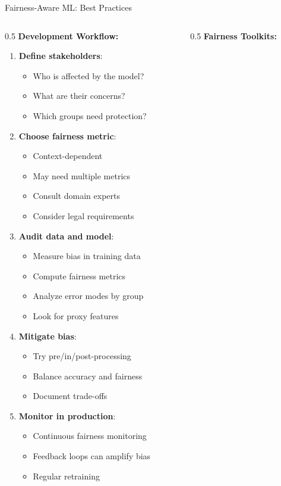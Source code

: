 \begin{frame}{Fairness-Aware ML: Best Practices}
\begin{columns}
\begin{column}{0.5\textwidth}
\textbf{Development Workflow:}

\begin{enumerate}
\item \textbf{Define stakeholders}:
   \begin{itemize}
   \item Who is affected by the model?
   \item What are their concerns?
   \item Which groups need protection?
   \end{itemize}

\item \textbf{Choose fairness metric}:
   \begin{itemize}
   \item Context-dependent
   \item May need multiple metrics
   \item Consult domain experts
   \item Consider legal requirements
   \end{itemize}

\item \textbf{Audit data and model}:
   \begin{itemize}
   \item Measure bias in training data
   \item Compute fairness metrics
   \item Analyze error modes by group
   \item Look for proxy features
   \end{itemize}

\item \textbf{Mitigate bias}:
   \begin{itemize}
   \item Try pre/in/post-processing
   \item Balance accuracy and fairness
   \item Document trade-offs
   \end{itemize}

\item \textbf{Monitor in production}:
   \begin{itemize}
   \item Continuous fairness monitoring
   \item Feedback loops can amplify bias
   \item Regular retraining
   \end{itemize}
\end{enumerate}
\end{column}
\begin{column}{0.5\textwidth}
\textbf{Fairness Toolkits:}


\end{column}
\end{columns}
\end{frame}
